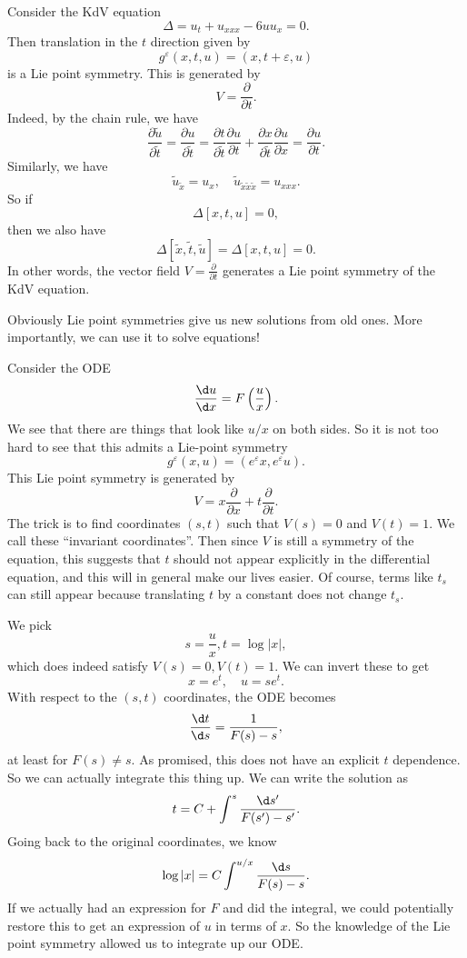 \documentclass[a4paper]{article}
\begin{document}
\begin{eg}
  Consider the KdV equation
  \[
    \Delta = u_t + u_{xxx} - 6 uu_x = 0.
  \]
  Then translation in the $t$ direction given by
  \[
    g^\varepsilon(x, t, u) = (x, t + \varepsilon, u)
  \]
  is a Lie point symmetry. This is generated by
  \[
    V = \frac{\partial}{\partial t}.
  \]
  Indeed, by the chain rule, we have
  \[
    \frac{\partial \tilde{u}}{\partial \tilde{t}} = \frac{\partial u}{\partial \tilde{t}} = \frac{\partial t}{\partial \tilde{t}} \frac{\partial u}{\partial t} + \frac{\partial x}{\partial \tilde{t}} \frac{\partial u}{\partial x} = \frac{\partial u}{\partial t}.
  \]
  Similarly, we have
  \[
    \tilde{u}_{\tilde{x}} = u_x,\quad \tilde{u}_{\tilde{x}\tilde{x}\tilde{x}} = u_{xxx}.
  \]
  So if
  \[
    \Delta[x, t, u] = 0,
  \]
  then we also have
  \[
    \Delta[\tilde{x}, \tilde{t}, \tilde{u}] = \Delta[x, t, u] = 0.
  \]
  In other words, the vector field $V = \frac{\partial}{\partial t}$ generates a Lie point symmetry of the KdV equation.
\end{eg}
Obviously Lie point symmetries give us new solutions from old ones. More importantly, we can use it to solve equations!
\begin{eg}
  Consider the ODE
  \[
    \frac{\d u}{\d x} = F\left(\frac{u}{x}\right).
  \]
  We see that there are things that look like $u/x$ on both sides. So it is not too hard to see that this admits a Lie-point symmetry
  \[
    g^\varepsilon (x, u) = (e^\varepsilon x, e^\varepsilon u).
  \]
  This Lie point symmetry is generated by
  \[
    V = x \frac{\partial}{\partial x} + t \frac{\partial}{\partial t}.
  \]
  The trick is to find coordinates $(s, t)$ such that $V(s) = 0$ and $V(t) = 1$. We call these ``invariant coordinates''. Then since $V$ is still a symmetry of the equation, this suggests that $t$ should not appear explicitly in the differential equation, and this will in general make our lives easier. Of course, terms like $t_s$ can still appear because translating $t$ by a constant does not change $t_s$.

  We pick
  \[
    s = \frac{u}{x}, t = \log |x|,
  \]
  which does indeed satisfy $V(s) = 0, V(t) = 1$. We can invert these to get
  \[
    x = e^t, \quad u = se^t.
  \]
  With respect to the $(s, t)$ coordinates, the ODE becomes
  \[
    \frac{\d t}{\d s} = \frac{1}{F(s) - s},
  \]
  at least for $F(s) \not= s$. As promised, this does not have an explicit $t$ dependence. So we can actually integrate this thing up. We can write the solution as
  \[
    t = C + \int^s \frac{\d s'}{F(s') - s'}.
  \]
  Going back to the original coordinates, we know
  \[
    \log |x| = C \int^{u/x} \frac{\d s}{F(s) - s}.
  \]
  If we actually had an expression for $F$ and did the integral, we could potentially restore this to get an expression of $u$ in terms of $x$. So the knowledge of the Lie point symmetry allowed us to integrate up our ODE.
\end{eg}
\end{document}
